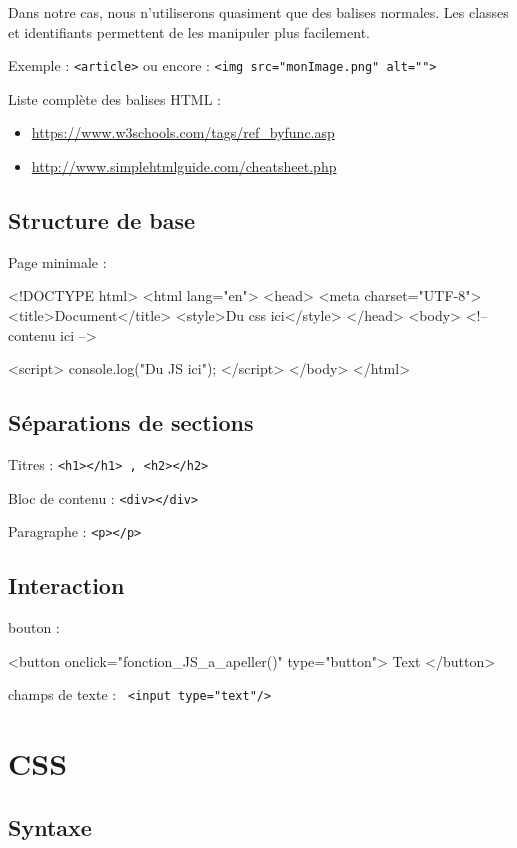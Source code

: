 \documentclass[10pt, landscape, french]{article}
\newcommand{\codeHTMLinline}[2] {
	#1 : \texttt{#2}
  }
\newenvironment{codeHTML}[1]{%
#1 :  %
\minted{HTML}%
}{%
\endminted%
}
\begin{document}
\begin{multicols*}{3}
Dans notre cas, nous n'utiliserons quasiment que des balises normales. Les classes et identifiants permettent de les manipuler plus facilement. 

\codeHTMLinline{Exemple}{<article>} ou \codeHTMLinline{encore}{<img src="monImage.png" alt="">}


Liste complète des balises HTML :
\begin{itemize}
	\item \url{https://www.w3schools.com/tags/ref_byfunc.asp}
	\item \url{http://www.simplehtmlguide.com/cheatsheet.php}
\end{itemize}

\subsection{Structure de base}
\begin{codeHTML}{Page minimale}
<!DOCTYPE html>
<html lang="en">
<head>
	<meta charset="UTF-8">
	<title>Document</title>
	<style>Du css ici</style>
</head>
<body>
	<!-- contenu ici -->

	<script>
	  console.log("Du JS ici");
	</script>
</body>
</html>
\end{codeHTML}


\subsection{Séparations de sections}
\codeHTMLinline{Titres}{<h1></h1> , <h2></h2>} \linebreak
\codeHTMLinline{Bloc de contenu}{<div></div>} \linebreak
\codeHTMLinline{Paragraphe}{<p></p>}

\subsection{Interaction}
\begin{codeHTML}{bouton}
<button 
  onclick="fonction_JS_a_apeller()" 
  type="button">
	Text
</button>
\end{codeHTML}
\codeHTMLinline{champs de texte}{	<input type="text"/>}


		\section{CSS}
\subsection{Syntaxe}    


\end{multicols*}
\end{document}
